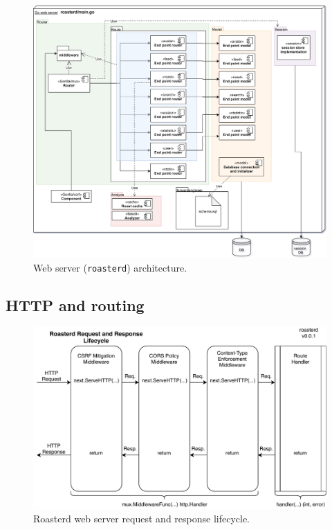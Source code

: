 \documentclass[12pt,a4paper]{report}
\begin{document}
\begin{figure}[H]
    \centering
    \includegraphics[width=17cm]{server-architecture.png}
    \caption{Web server (\texttt{roasterd}) architecture.}
\end{figure}

\subsection{HTTP and routing}
\begin{figure}[H]
    \centering
    \includegraphics[width=16cm]{roasterd-req-resp-lifecycle-v0_0_1.pdf}
    \caption{Roasterd web server request and response lifecycle.}
    \label{fig:roasterd-lifecycle}
\end{figure}
\end{document}
